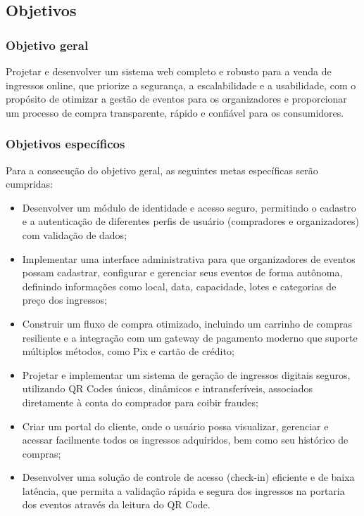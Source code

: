 \subsection{Objetivos}

\subsubsection{Objetivo geral}

Projetar e desenvolver um sistema web completo e robusto para a venda de ingressos online, que priorize a segurança, a escalabilidade e a usabilidade, com o propósito de otimizar a gestão de eventos para os organizadores e proporcionar um processo de compra transparente, rápido e confiável para os consumidores.

\subsubsection{Objetivos específicos}

Para a consecução do objetivo geral, as seguintes metas específicas serão cumpridas:
\begin{itemize}
    \item Desenvolver um módulo de identidade e acesso seguro, permitindo o cadastro e a autenticação de diferentes perfis de usuário (compradores e organizadores) com validação de dados;
    \item Implementar uma interface administrativa para que organizadores de eventos possam cadastrar, configurar e gerenciar seus eventos de forma autônoma, definindo informações como local, data, capacidade, lotes e categorias de preço dos ingressos;
    \item Construir um fluxo de compra otimizado, incluindo um carrinho de compras resiliente e a integração com um gateway de pagamento moderno que suporte múltiplos métodos, como Pix e cartão de crédito;
    \item Projetar e implementar um sistema de geração de ingressos digitais seguros, utilizando QR Codes únicos, dinâmicos e intransferíveis, associados diretamente à conta do comprador para coibir fraudes;
    \item Criar um portal do cliente, onde o usuário possa visualizar, gerenciar e acessar facilmente todos os ingressos adquiridos, bem como seu histórico de compras;
    \item Desenvolver uma solução de controle de acesso (check-in) eficiente e de baixa latência, que permita a validação rápida e segura dos ingressos na portaria dos eventos através da leitura do QR Code.
\end{itemize}

